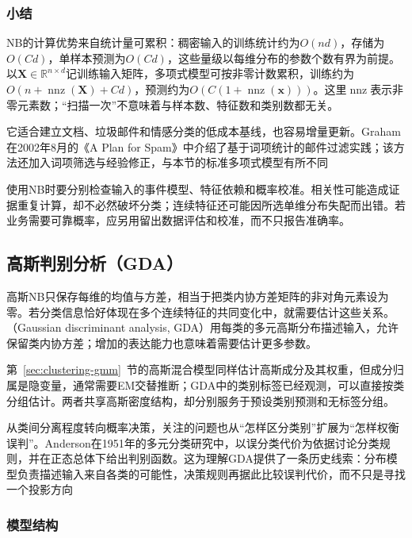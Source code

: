 \subsubsection{小结}
\label{sec:classification-naive-bayes-summary}

NB的计算优势来自统计量可累积：稠密输入的训练统计约为$O(nd)$，存储为$O(Cd)$，单样本预测为$O(Cd)$，这些量级以每维分布的参数个数有界为前提。以$\bm{X}\in\mathbb{R}^{n\times d}$记训练输入矩阵，多项式模型可按非零计数累积，训练约为$O(n+\operatorname{nnz}(\bm{X})+Cd)$，预测约为$O(C(1+\operatorname{nnz}(\bm{x})))$。这里$\operatorname{nnz}$表示非零元素数；“扫描一次”不意味着与样本数、特征数和类别数都无关。

它适合建立文档、垃圾邮件和情感分类的低成本基线，也容易增量更新。Graham在2002年8月的《A Plan for Spam》中介绍了基于词项统计的邮件过滤实践；该方法还加入词项筛选与经验修正，与本节的标准多项式模型有所不同

使用NB时要分别检查输入的事件模型、特征依赖和概率校准。相关性可能造成证据重复计算，却不必然破坏分类；连续特征还可能因所选单维分布失配而出错。若业务需要可靠概率，应另用留出数据评估和校准，而不只报告准确率。

\subsection{高斯判别分析（GDA）}
\label{sec:classification-gda}

高斯NB只保存每维的均值与方差，相当于把类内协方差矩阵的非对角元素设为零。若分类信息恰好体现在多个连续特征的共同变化中，就需要估计这些关系。（Gaussian discriminant analysis, GDA）用每类的多元高斯分布描述输入，允许保留类内协方差；增加的表达能力也意味着需要估计更多参数。

第~\ref{sec:clustering-gmm}~节的高斯混合模型同样估计高斯成分及其权重，但成分归属是隐变量，通常需要EM交替推断；GDA中的类别标签已经观测，可以直接按类分组估计。两者共享高斯密度结构，却分别服务于预设类别预测和无标签分组。

从类间分离程度转向概率决策，关注的问题也从“怎样区分类别”扩展为“怎样权衡误判”。Anderson在1951年的多元分类研究中，以误分类代价为依据讨论分类规则，并在正态总体下给出判别函数。这为理解GDA提供了一条历史线索：分布模型负责描述输入来自各类的可能性，决策规则再据此比较误判代价，而不只是寻找一个投影方向

\subsubsection{模型结构}
\label{sec:classification-gda-structure}

